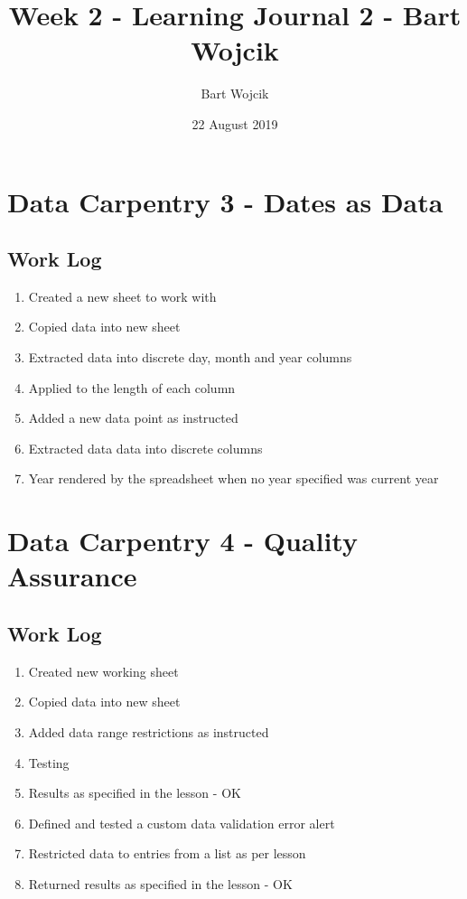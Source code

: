\documentclass{article}
\title{Week 2 - Learning Journal 2 - Bart Wojcik}
\author{Bart Wojcik}
\date{22 August 2019}
\begin{document}
\maketitle

\section{Data Carpentry 3 - Dates as Data}
\subsection{Work Log}
\begin{enumerate}
    \item Created a new sheet to work with
    \item Copied data into new sheet
    \item Extracted data into discrete day, month and year columns
    \item Applied to the length of each column
    \item Added a new data point as instructed
    \item Extracted data data into discrete columns
    \item Year rendered by the spreadsheet when no year specified was current year
\end{enumerate}

\section{Data Carpentry 4 - Quality Assurance}
\subsection{Work Log}
\begin{enumerate}
    \item Created new working sheet
    \item Copied data into new sheet
    \item Added data range restrictions as instructed
    \item Testing
    \item Results as specified in the lesson - OK
    \item Defined and tested a custom data validation error alert
    \item Restricted data to entries from a list as per lesson
    \item Returned results as specified in the lesson - OK
\end{enumerate}
\end{document}
